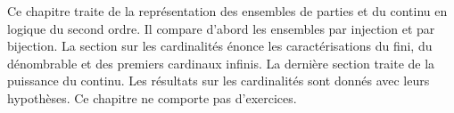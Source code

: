 \documentclass[../../../include/open-logic-chapter]{subfiles}
\begin{document}

Ce chapitre traite de la représentation des
ensembles de parties et du continu en logique
du second ordre. Il compare d'abord les ensembles
par injection et par bijection. La section sur les
cardinalités énonce les caractérisations du fini,
du dénombrable et des premiers cardinaux infinis.
La dernière section traite de la puissance du continu.
Les résultats sur les cardinalités sont donnés avec
leurs hypothèses. Ce chapitre ne comporte pas d'exercices.





\OLEndChapterHook
\end{document}
